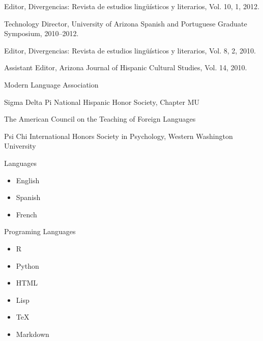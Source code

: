 \documentclass[11pt]{article}
\begin{document}
\noindent Editor, Divergencias: Revista de estudios lingüísticos y literarios, Vol. 10, 1, 2012. \\ \vspace{-0.1in}

\noindent Technology Director, University of Arizona Spanish and Portuguese Graduate Symposium, 2010--2012. \\ \vspace{-0.1in}

\noindent Editor, Divergencias: Revista de estudios lingüísticos y literarios, Vol. 8, 2, 2010. \\ \vspace{-0.1in}

\noindent Assistant Editor, Arizona Journal of Hispanic Cultural Studies, Vol. 14, 2010.


\clearpage


\noindent Modern Language Association \\ \vspace{-0.1in}

\noindent Sigma Delta Pi National Hispanic Honor Society, Chapter MU \\ \vspace{-0.1in}

\noindent The American Council on the Teaching of Foreign Languages \\ \vspace{-0.1in}

\noindent Psi Chi International Honors Society in Psychology, Western Washington University


\bigskip 

 
\noindent Languages
\begin{itemize}
  \item English \vspace{-0.1in}
  \item Spanish \vspace{-0.1in}
  \item French
\end{itemize}

\noindent Programing Languages
\begin{itemize}
  \item R \vspace{-0.1in}
  \item Python \vspace{-0.1in}
  \item HTML \vspace{-0.1in}
  \item Lisp \vspace{-0.1in}
  \item TeX \vspace{-0.1in}
  \item Markdown
\end{itemize}
\end{document}
